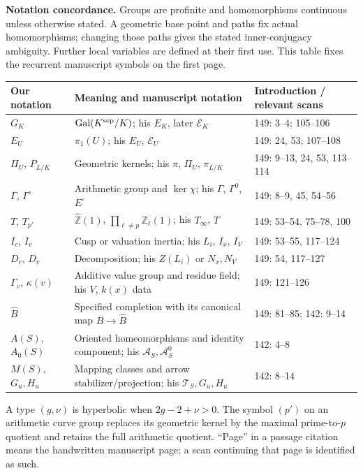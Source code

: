 \documentclass[11pt,a4paper]{article}
\DeclareMathOperator{\Gal}{Gal}
\begin{document}
\smallskip
\noindent\textbf{Notation concordance.}
Groups are profinite and homomorphisms continuous unless otherwise stated.
A geometric base point and paths fix actual homomorphisms; changing those
paths gives the stated inner-conjugacy ambiguity. Further local variables
are defined at their first use. This table fixes the recurrent manuscript
symbols on the first page.
\begin{center}\small
\renewcommand{\arraystretch}{1.12}
\begin{tabular}{@{}L{.17\textwidth}L{.39\textwidth}L{.34\textwidth}@{}}
\toprule
Our notation & Meaning and manuscript notation & Introduction / relevant scans\\
\midrule
$G_K$ & $\Gal(K^{\rm sep}/K)$; his $E_K$, later $\mathcal E_K$ & 149: 3--4; 105--106\\
$E_U$ & $\pi_1(U)$; his $E_U$, $\mathcal E_U$ & 149: 24, 53; 107--108\\
$\Pi_U$, $P_{L/K}$ & Geometric kernels; his $\pi$, $\Pi_U$, $\pi_{L/K}$ & 149: 9--13, 24, 53, 113--114\\
$\Gamma$, $\Gamma^\circ$ & Arithmetic group and $\ker\chi$; his $\Gamma$, $\Gamma^0$, $E^\circ$ & 149: 8--9, 45, 54--56\\
$T$, $T_{p'}$ & $\widehat{\mathbb Z}(1)$, $\prod_{\ell\ne p}\mathbb Z_\ell(1)$; his $T_\infty$, $T$ & 149: 53--54, 75--78, 100\\
$I_c$, $I_v$ & Cusp or valuation inertia; his $L_i$, $I_x$, $I_V$ & 149: 53--55, 117--124\\
$D_c$, $D_v$ & Decomposition; his $Z(L_i)$ or $N_x,N_V$ & 149: 54, 117--127\\
$\Gamma_v$, $\kappa(v)$ & Additive value group and residue field; his $V$, $k(x)$ data & 149: 121--126\\
$\widehat B$ & Specified completion with its canonical map $B\to\widehat B$ & 149: 81--85; 142: 9--14\\
$A(S)$, $A_0(S)$ & Oriented homeomorphisms and identity component; his $\mathcal A_S,\mathcal A_S^0$ & 142: 4--8\\
$M(S)$, $G_u,H_u$ & Mapping classes and arrow stabilizer/projection; his $\mathcal T_S,G_u,H_u$ & 142: 8--14\\
\bottomrule
\end{tabular}
\end{center}
\noindent\small A type $(g,\nu)$ is hyperbolic when $2g-2+\nu>0$.
The symbol $(p')$ on an arithmetic curve group replaces its geometric
kernel by the maximal prime-to-$p$ quotient and retains the full
arithmetic quotient. ``Page'' in a passage citation means the handwritten
manuscript page; a scan continuing that page is identified as such.
\normalsize
\clearpage
\end{document}
